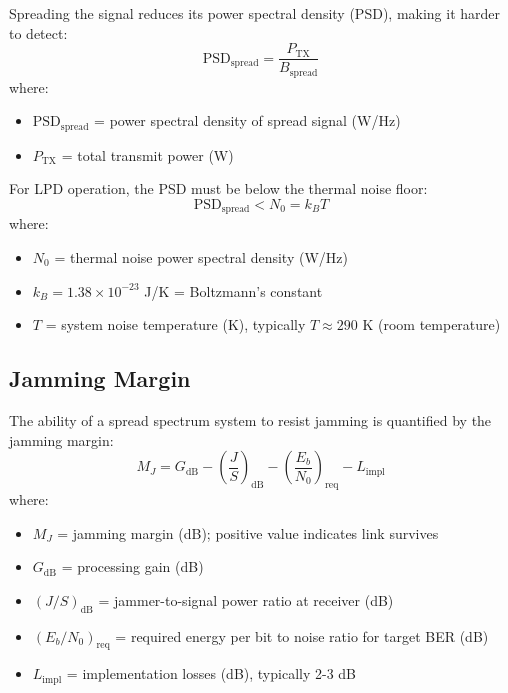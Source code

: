 Spreading the signal reduces its power spectral density (PSD), making it harder to detect:
\begin{equation}
\text{PSD}_{\text{spread}} = \frac{P_{\text{TX}}}{B_{\text{spread}}}
\label{eq:psd-spread}
\end{equation}
where:
\begin{itemize}
\item $\text{PSD}_{\text{spread}}$ = power spectral density of spread signal (W/Hz)
\item $P_{\text{TX}}$ = total transmit power (W)
\end{itemize}

For LPD operation, the PSD must be below the thermal noise floor:
\begin{equation}
\text{PSD}_{\text{spread}} < N_0 = k_B T
\label{eq:lpd-condition}
\end{equation}
where:
\begin{itemize}
\item $N_0$ = thermal noise power spectral density (W/Hz)
\item $k_B = 1.38 \times 10^{-23}$ J/K = Boltzmann's constant
\item $T$ = system noise temperature (K), typically $T \approx 290$ K (room temperature)
\end{itemize}

\subsection{Jamming Margin}

The ability of a spread spectrum system to resist jamming is quantified by the jamming margin:
\begin{equation}
M_J = G_{\text{dB}} - \left(\frac{J}{S}\right)_{\text{dB}} - \left(\frac{E_b}{N_0}\right)_{\text{req}} - L_{\text{impl}}
\label{eq:jamming-margin}
\end{equation}
where:
\begin{itemize}
\item $M_J$ = jamming margin (dB); positive value indicates link survives
\item $G_{\text{dB}}$ = processing gain (dB)
\item $(J/S)_{\text{dB}}$ = jammer-to-signal power ratio at receiver (dB)
\item $(E_b/N_0)_{\text{req}}$ = required energy per bit to noise ratio for target BER (dB)
\item $L_{\text{impl}}$ = implementation losses (dB), typically 2-3 dB
\end{itemize}

